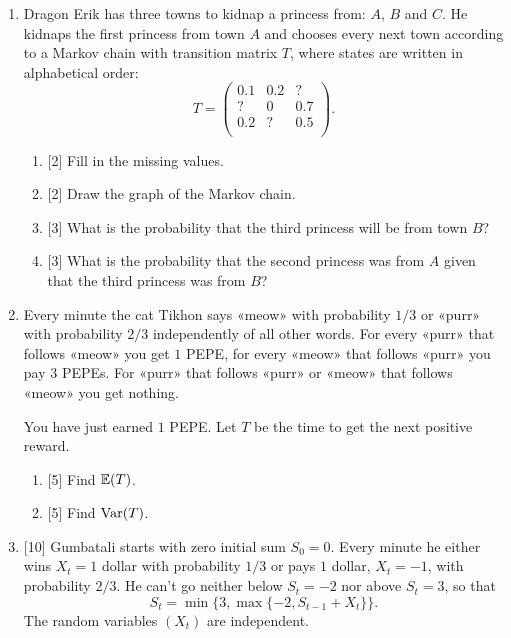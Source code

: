 \begin{enumerate}
    \item Dragon Erik has three towns to kidnap a princess from: $A$, $B$ and $C$.
    He kidnaps the first princess from town $A$ and chooses every next town according to a Markov chain with transition matrix $T$,
    where states are written in alphabetical order:
    \[
    T = \begin{pmatrix}
        0.1 & 0.2 & ? \\
        ? &  0 & 0.7 \\
        0.2 & ? & 0.5 \\
    \end{pmatrix}.
    \]
    \begin{enumerate}
        \item {[2]} Fill in the missing values. 
        \item {[2]} Draw the graph of the Markov chain. 
        \item {[3]} What is the probability that the third princess will be from town $B$?
        \item {[3]} What is the probability that the second princess was from $A$ given that the third princess was from $B$?
    \end{enumerate}


    \item Every minute the cat Tikhon says «meow» with probability $1/3$ or «purr» with probability $2/3$ independently of all other words.
    For every «purr» that follows «meow» you get $1$ PEPE, for every «meow» that follows «purr» you pay $3$ PEPEs. 
    For «purr» that follows «purr» or «meow» that follows «meow» you get nothing. 

    You have just earned $1$ PEPE. 
    Let $T$ be the time to get the next positive reward. 
    \begin{enumerate}
        \item {[5]} Find $\operatorname{\mathbb{E}}(T)$.
        \item {[5]} Find $\operatorname{Var}(T)$.
    \end{enumerate}

    \item {[10]} Gumbatali starts with zero initial sum $S_0 = 0$. 
    Every minute he either wins $X_t = 1$ dollar with probability $1/3$ or pays $1$ dollar, $X_t = -1$, with probability $2/3$.
    He can't go neither below $S_t = -2$ nor above $S_t = 3$, so that
    \[
    S_t = \min\{3, \max\{-2, S_{t-1} + X_t\}\}.
    \]
    The random variables $(X_t)$ are independent. 
    

\end{enumerate}
